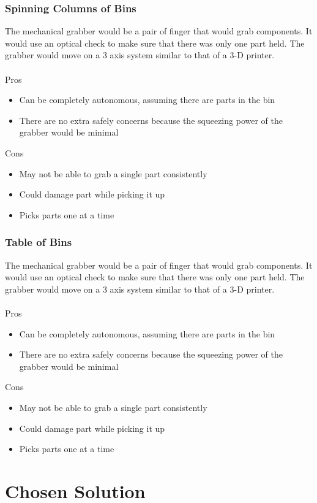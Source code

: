 \documentclass[12pt]{report}
\begin{document}
\subsubsection*{Spinning Columns of Bins}
The mechanical grabber would be a pair of finger that would grab components. It would use an optical check to make sure that there was only one part held. The grabber would move on a 3 axis system similar to that of a 3-D printer. \\ \\
Pros
\begin{itemize}
\item Can be completely autonomous, assuming there are parts in the bin
\item There are no extra safely concerns because the squeezing power of the grabber would be minimal
\end{itemize}
Cons
\begin{itemize}
\item May not be able to grab a single part consistently
\item Could damage part while picking it up
\item Picks parts one at a time
\end{itemize}

\subsubsection*{Table of Bins}
The mechanical grabber would be a pair of finger that would grab components. It would use an optical check to make sure that there was only one part held. The grabber would move on a 3 axis system similar to that of a 3-D printer. \\ \\
Pros
\begin{itemize}
\item Can be completely autonomous, assuming there are parts in the bin
\item There are no extra safely concerns because the squeezing power of the grabber would be minimal
\end{itemize}
Cons
\begin{itemize}
\item May not be able to grab a single part consistently
\item Could damage part while picking it up
\item Picks parts one at a time
\end{itemize}

\section*{Chosen Solution}
\end{document}
